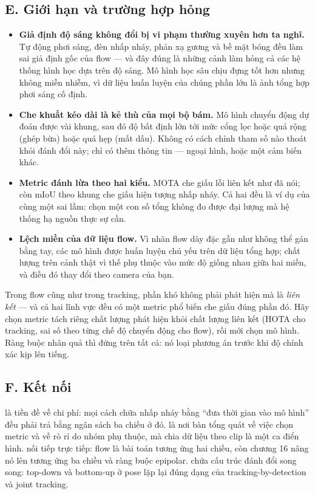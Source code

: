 \documentclass[../../../deep_learning.tex]{subfiles}
\begin{document}
\subsection{E. Giới hạn và trường hợp hỏng}

\begin{itemize}
\item \textbf{Giả định độ sáng không đổi bị vi phạm thường xuyên hơn ta nghĩ.} Tự động phơi sáng, đèn nhấp nháy, phản xạ gương và bề mặt bóng đều làm sai giả định gốc của flow --- và đây đúng là những cảnh làm hỏng cả các hệ thống hình học dựa trên độ sáng. Mô hình học sâu chịu đựng tốt hơn nhưng không miễn nhiễm, vì dữ liệu huấn luyện của chúng phần lớn là ảnh tổng hợp phơi sáng cố định.
\item \textbf{Che khuất kéo dài là kẻ thù của mọi bộ bám.} Mô hình chuyển động dự đoán được vài khung, sau đó độ bất định lớn tới mức cổng lọc hoặc quá rộng (ghép bừa) hoặc quá hẹp (mất dấu). Không có cách chỉnh tham số nào thoát khỏi đánh đổi này; chỉ có thêm thông tin --- ngoại hình, hoặc một cảm biến khác.
\item \textbf{Metric đánh lừa theo hai kiểu.} MOTA che giấu lỗi liên kết như đã nói; còn mIoU theo khung che giấu hiện tượng nhấp nháy. Cả hai đều là ví dụ của cùng một sai lầm: chọn một con số tổng không đo được đại lượng mà hệ thống hạ nguồn thực sự cần.
\item \textbf{Lệch miền của dữ liệu flow.} Vì nhãn flow dày đặc gần như không thể gán bằng tay, các mô hình được huấn luyện chủ yếu trên dữ liệu tổng hợp; chất lượng trên cảnh thật vì thế phụ thuộc vào mức độ giống nhau giữa hai miền, và điều đó thay đổi theo camera của bạn.
\end{itemize}

\begin{cannho}
Trong flow cũng như trong tracking, phần khó không phải phát hiện mà là \emph{liên kết} --- và cả hai lĩnh vực đều có một metric phổ biến che giấu đúng phần đó. Hãy chọn metric tách riêng chất lượng phát hiện khỏi chất lượng liên kết (HOTA cho tracking, sai số theo từng chế độ chuyển động cho flow), rồi mới chọn mô hình. Ràng buộc nhân quả thì đứng trên tất cả: nó loại phương án trước khi độ chính xác kịp lên tiếng. 
\end{cannho}

\subsection{F. Kết nối}
 là tiền đề về chi phí: mọi cách chữa nhấp nháy bằng ``đưa thời gian vào mô hình'' đều phải trả bằng ngân sách ba chiều ở đó.  là nơi bàn tổng quát về việc chọn metric và về rò rỉ do nhóm phụ thuộc, mà chia dữ liệu theo clip là một ca điển hình.  nối tiếp trực tiếp: flow là bài toán tương ứng hai chiều, còn chương 16 nâng nó lên tương ứng ba chiều và ràng buộc epipolar.  chứa cấu trúc đánh đổi song song: top-down và bottom-up ở pose lặp lại đúng dạng của tracking-by-detection và joint tracking.
\end{document}
